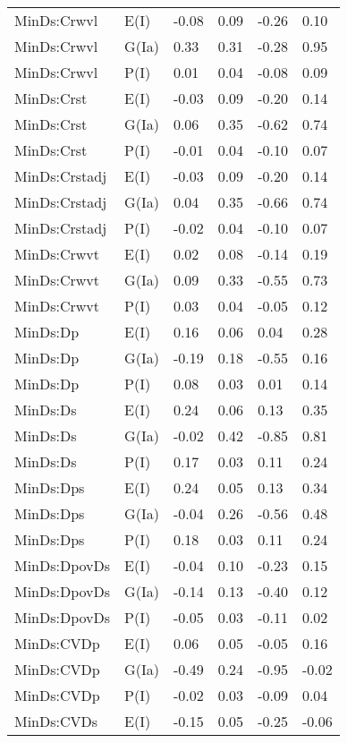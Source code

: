 \begin{center}
\begin{longtable}{|p{1.1in}|p{0.7in}|p{0.7in}|p{0.6in}|p{0.6in}|p{0.6in}|}
  MinDs:Crwvl & E(I) & -0.08 & 0.09 & -0.26 & 0.10 \\ 
  MinDs:Crwvl & G(Ia) & 0.33 & 0.31 & -0.28 & 0.95 \\ 
  MinDs:Crwvl & P(I) & 0.01 & 0.04 & -0.08 & 0.09 \\ 
  MinDs:Crst & E(I) & -0.03 & 0.09 & -0.20 & 0.14 \\ 
  MinDs:Crst & G(Ia) & 0.06 & 0.35 & -0.62 & 0.74 \\ 
  MinDs:Crst & P(I) & -0.01 & 0.04 & -0.10 & 0.07 \\ 
  MinDs:Crstadj & E(I) & -0.03 & 0.09 & -0.20 & 0.14 \\ 
  MinDs:Crstadj & G(Ia) & 0.04 & 0.35 & -0.66 & 0.74 \\ 
  MinDs:Crstadj & P(I) & -0.02 & 0.04 & -0.10 & 0.07 \\ 
  MinDs:Crwvt & E(I) & 0.02 & 0.08 & -0.14 & 0.19 \\ 
  MinDs:Crwvt & G(Ia) & 0.09 & 0.33 & -0.55 & 0.73 \\ 
  MinDs:Crwvt & P(I) & 0.03 & 0.04 & -0.05 & 0.12 \\ 
  MinDs:Dp & E(I) & 0.16 & 0.06 & 0.04 & 0.28 \\ 
  MinDs:Dp & G(Ia) & -0.19 & 0.18 & -0.55 & 0.16 \\ 
  MinDs:Dp & P(I) & 0.08 & 0.03 & 0.01 & 0.14 \\ 
  MinDs:Ds & E(I) & 0.24 & 0.06 & 0.13 & 0.35 \\ 
  MinDs:Ds & G(Ia) & -0.02 & 0.42 & -0.85 & 0.81 \\ 
  MinDs:Ds & P(I) & 0.17 & 0.03 & 0.11 & 0.24 \\ 
  MinDs:Dps & E(I) & 0.24 & 0.05 & 0.13 & 0.34 \\ 
  MinDs:Dps & G(Ia) & -0.04 & 0.26 & -0.56 & 0.48 \\ 
  MinDs:Dps & P(I) & 0.18 & 0.03 & 0.11 & 0.24 \\ 
  MinDs:DpovDs & E(I) & -0.04 & 0.10 & -0.23 & 0.15 \\ 
  MinDs:DpovDs & G(Ia) & -0.14 & 0.13 & -0.40 & 0.12 \\ 
  MinDs:DpovDs & P(I) & -0.05 & 0.03 & -0.11 & 0.02 \\ 
  MinDs:CVDp & E(I) & 0.06 & 0.05 & -0.05 & 0.16 \\ 
  MinDs:CVDp & G(Ia) & -0.49 & 0.24 & -0.95 & -0.02 \\ 
  MinDs:CVDp & P(I) & -0.02 & 0.03 & -0.09 & 0.04 \\ 
  MinDs:CVDs & E(I) & -0.15 & 0.05 & -0.25 & -0.06 \\ 

\end{longtable}
\end{center}
